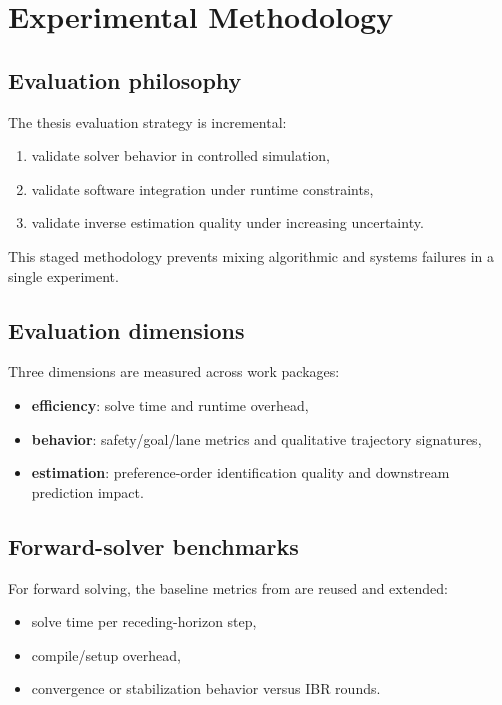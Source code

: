 \chapter{Experimental Methodology}

\section{Evaluation philosophy}

The thesis evaluation strategy is incremental:

\begin{enumerate}
    \item validate solver behavior in controlled simulation,
    \item validate software integration under runtime constraints,
    \item validate inverse estimation quality under increasing uncertainty.
\end{enumerate}

This staged methodology prevents mixing algorithmic and systems failures in a
single experiment.

\section{Evaluation dimensions}

Three dimensions are measured across work packages:

\begin{itemize}
    \item \textbf{efficiency}: solve time and runtime overhead,
    \item \textbf{behavior}: safety/goal/lane metrics and qualitative
    trajectory signatures,
    \item \textbf{estimation}: preference-order identification quality and
    downstream prediction impact.
\end{itemize}

\section{Forward-solver benchmarks}

For forward solving, the baseline metrics from \cite{delasheras:2025} are reused
and extended:

\begin{itemize}
    \item solve time per receding-horizon step,
    \item compile/setup overhead,
    \item convergence or stabilization behavior versus IBR rounds.
\end{itemize}


